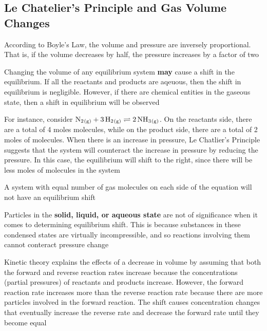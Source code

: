 \subsection{Le Chatelier's Principle and Gas Volume Changes}
\begin{bulleted-list}
    \item According to Boyle's Law, the volume and pressure are inversely proportional. That is,
        if the volume decreases by half, the pressure increases by a factor of two
    \item Changing the volume of any equilibrium system \textbf{may} cause a shift in the equilibrium.
        If all the reactants and products are aqeuous, then the shift in equilibrium is negligible.
        However, if there are chemical entities in the gaseous state, then a shift in equilibrium
        will be observed
    \item For instance, consider $\ch{N2_{(g)}}+\ch{3H2_{(g)}}\rightleftharpoons \ch{2NH3_{(g)}}$.
        On the reactants side, there are a total of 4 moles molecules, while on the product side, 
        there are a total of 2 moles of molecules. When there is an increase in pressure, Le Chatlier's
        Principle suggests that the system will counteract the increase in pressure by reducing
        the pressure. In this case, the equilibrium will shift to the right, since there will be
        less moles of molecules in the system
    \item A system with equal number of gas molecules on each side of the equation will not have
        an equilibrium shift
    \item Particles in the \textbf{solid, liquid, or aqueous state} are not of significance when it comes
        to determining equilibrium shift. This is because substances in these condensed states are
        virtually incompressible, and so reactions involving them cannot conteract pressure change
    \item Kinetic theory explains the effects of a decrease in volume by assuming that both the
        forward and reverse reaction rates increase because the concentrations (partial pressures)
        of reactants and products increase. However, the forward reaction rate increases more than
        the reverse reaction rate because there are more particles involved in the forward reaction.
        The shift causes concentration changes that eventually increase the reverse rate and decrease
        the forward rate until they become equal
\end{bulleted-list}

